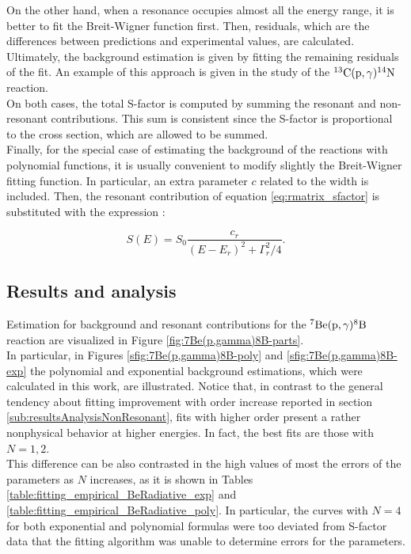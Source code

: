 \documentclass[openany]{book}
\begin{document}
On the other hand, when a resonance occupies almost all the energy range, it is better to fit the Breit-Wigner function first. Then, residuals, which are the differences between predictions and experimental values, are calculated. Ultimately, the background estimation is given by fitting the remaining residuals of the fit. An example of this approach is given in the study of the $\mathrm{{}^{13}C(p, \gamma){}^{14}N}$ reaction. \\

On both cases, the total S-factor is computed by summing the resonant and non-resonant contributions. This sum is consistent since the S-factor is proportional to the cross section, which are allowed to be summed. \\

Finally, for the special case of estimating the background of the reactions with polynomial functions, it is usually convenient to modify slightly the Breit-Wigner fitting function. In particular, an extra parameter $c$ related to the width is included. Then, the resonant contribution of equation \ref{eq:rmatrix_sfactor} is substituted with the expression \cite{sparta_pizzone_bertulani_hou_lamia_tumino_2020}:

\begin{equation}\label{eq:rmatrix_sfactor_modified}
	S(E) = S_0 \frac{c_r}{(E - E_r)^2 + \Gamma_r^2/4}. 
\end{equation}

\subsection{Results and analysis} \label{sub:resultsAnalysisResonant}

Estimation for background and resonant contributions for the $\mathrm{{}^{7}Be(p, \gamma){}^{8}B}$ reaction are visualized in Figure \ref{fig:7Be(p,gamma)8B-parts}. \\

In particular, in Figures \ref{sfig:7Be(p,gamma)8B-poly} and \ref{sfig:7Be(p,gamma)8B-exp} the polynomial and exponential background estimations, which were calculated in this work, are illustrated. Notice that, in contrast to the general tendency about fitting improvement with order increase reported in section \ref{sub:resultsAnalysisNonResonant}, fits with higher order present a rather nonphysical behavior at higher energies. In fact, the best fits are those with $N = 1, 2$.  \\

This difference can be also contrasted in the high values of most the errors of the parameters as $N$ increases, as it is shown in Tables \ref{table:fitting_empirical_BeRadiative_exp} and \ref{table:fitting_empirical_BeRadiative_poly}. In particular, the curves with $N = 4$ for both exponential and polynomial formulas were too deviated from S-factor data that the fitting algorithm was unable to determine errors for the parameters.   \\
\end{document}
